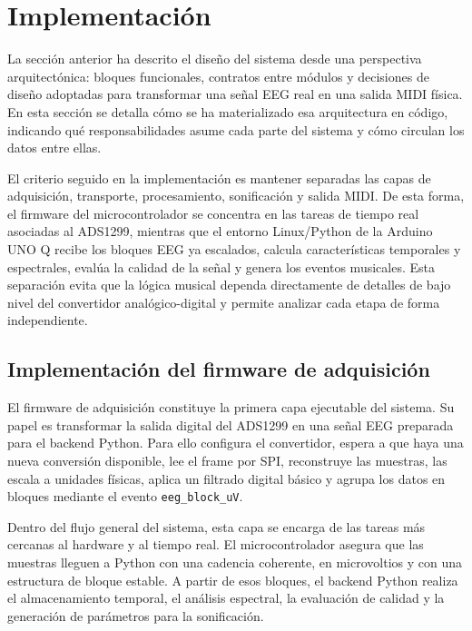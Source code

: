 \documentclass[../main.tex]{subfiles}
\begin{document}
\section{Implementación}

La sección anterior ha descrito el diseño del sistema desde una perspectiva arquitectónica: bloques funcionales, contratos entre módulos y decisiones de diseño adoptadas para transformar una señal EEG real en una salida MIDI física. En esta sección se detalla cómo se ha materializado esa arquitectura en código, indicando qué responsabilidades asume cada parte del sistema y cómo circulan los datos entre ellas.

El criterio seguido en la implementación es mantener separadas las capas de adquisición, transporte, procesamiento, sonificación y salida MIDI. De esta forma, el firmware del microcontrolador se concentra en las tareas de tiempo real asociadas al ADS1299, mientras que el entorno Linux/Python de la Arduino UNO Q recibe los bloques EEG ya escalados, calcula características temporales y espectrales, evalúa la calidad de la señal y genera los eventos musicales. Esta separación evita que la lógica musical dependa directamente de detalles de bajo nivel del convertidor analógico-digital y permite analizar cada etapa de forma independiente.

\subsection{Implementación del firmware de adquisición}

El firmware de adquisición constituye la primera capa ejecutable del sistema. Su papel es transformar la salida digital del ADS1299 en una señal EEG preparada para el backend Python. Para ello configura el convertidor, espera a que haya una nueva conversión disponible, lee el frame por SPI, reconstruye las muestras, las escala a unidades físicas, aplica un filtrado digital básico y agrupa los datos en bloques mediante el evento \texttt{eeg\_block\_uV}.

Dentro del flujo general del sistema, esta capa se encarga de las tareas más cercanas al hardware y al tiempo real. El microcontrolador asegura que las muestras lleguen a Python con una cadencia coherente, en microvoltios y con una estructura de bloque estable. A partir de esos bloques, el backend Python realiza el almacenamiento temporal, el análisis espectral, la evaluación de calidad y la generación de parámetros para la sonificación.
\end{document}

